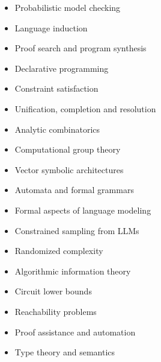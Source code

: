\documentclass{article}
\begin{document}
    \begin{multicols}{2}
     \begin{itemize}
        \item Probabilistic model checking
        \item Language induction
        \item Proof search and program synthesis
        \item Declarative programming
        \item Constraint satisfaction
        \item Unification, completion and resolution
        \item Analytic combinatorics
        \item Computational group theory
        \item Vector symbolic architectures
        \item Automata and formal grammars
        \item Formal aspects of language modeling~\cite{cotterell2023formal}
        \item Constrained sampling from LLMs
        \item Randomized complexity
        \item Algorithmic information theory
        \item Circuit lower bounds
        \item Reachability problems
        \item Proof assistance and automation
        \item Type theory and semantics
    \end{itemize}
    \end{multicols}

    \clearpage



\end{document}
